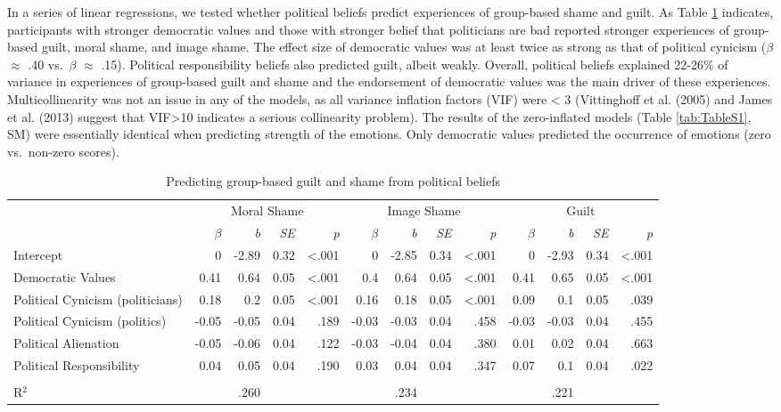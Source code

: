 \documentclass[
]{article}
\begin{document}
In a series of linear regressions, we tested whether political beliefs predict experiences of group-based shame and guilt. As Table \ref{tab:Table1} indicates, participants with stronger democratic values and those with stronger belief that politicians are bad reported stronger experiences of group-based guilt, moral shame, and image shame. The effect size of democratic values was at least twice as strong as that of political cynicism (\(\beta\) \(\approx\) .40 vs.~\(\beta\) \(\approx\) .15). Political responsibility beliefs also predicted guilt, albeit weakly. Overall, political beliefs explained 22-26\% of variance in experiences of group-based guilt and shame and the endorsement of democratic values was the main driver of these experiences. Multicollinearity was not an issue in any of the models, as all variance inflation factors (VIF) were \textless{} 3 (Vittinghoff et al. (2005) and James et al. (2013) suggest that VIF\textgreater10 indicates a serious collinearity problem). The results of the zero-inflated models (Table \ref{tab:TableS1}, SM) were essentially identical when predicting strength of the emotions. Only democratic values predicted the occurrence of emotions (zero vs.~non-zero scores).

\begin{table}[H]
\centering
\caption{\label{tab:Table1}Predicting group-based guilt and shame from political beliefs}
\centering
\fontsize{8}{10}\selectfont
\begin{tabular}[t]{lrrrrrrrrrrrr}
\toprule
\multicolumn{1}{c}{} & \multicolumn{4}{c}{Moral Shame} & \multicolumn{4}{c}{Image Shame} & \multicolumn{4}{c}{Guilt} \\
\cmidrule(l{3pt}r{3pt}){2-5} \cmidrule(l{3pt}r{3pt}){6-9} \cmidrule(l{3pt}r{3pt}){10-13}
\em{ } & \em{$\beta$} & \em{b} & \em{SE} & \em{p} & \em{$\beta$} & \em{b} & \em{SE} & \em{p} & \em{$\beta$} & \em{b} & \em{SE} & \em{p}\\
\midrule
Intercept & 0 & -2.89 & 0.32 & <.001 & 0 & -2.85 & 0.34 & <.001 & 0 & -2.93 & 0.34 & <.001\\
Democratic Values & 0.41 & 0.64 & 0.05 & <.001 & 0.4 & 0.64 & 0.05 & <.001 & 0.41 & 0.65 & 0.05 & <.001\\
Political Cynicism (politicians) & 0.18 & 0.2 & 0.05 & <.001 & 0.16 & 0.18 & 0.05 & <.001 & 0.09 & 0.1 & 0.05 & .039\\
Political Cynicism (politics) & -0.05 & -0.05 & 0.04 & .189 & -0.03 & -0.03 & 0.04 & .458 & -0.03 & -0.03 & 0.04 & .455\\
Political Alienation & -0.05 & -0.06 & 0.04 & .122 & -0.03 & -0.04 & 0.04 & .380 & 0.01 & 0.02 & 0.04 & .663\\
\addlinespace
Political Responsibility & 0.04 & 0.05 & 0.04 & .190 & 0.03 & 0.04 & 0.04 & .347 & 0.07 & 0.1 & 0.04 & .022\\
\midrule\\
R$^{2}$ &  & .260 &  &  &  & .234 &  &  &  & .221 &  & \\
\bottomrule
\end{tabular}
\end{table}
\end{document}
